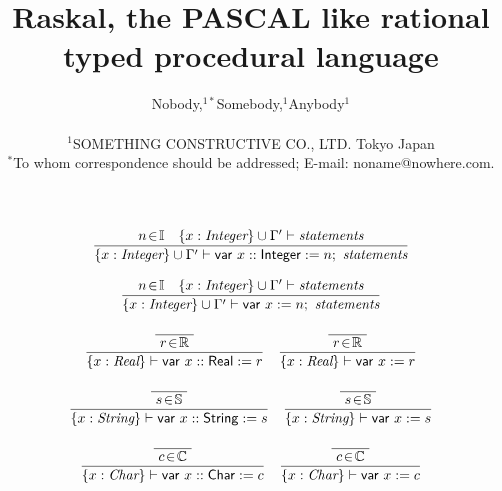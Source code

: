 \documentclass[12pt]{article}
\title{Raskal, the PASCAL like rational typed procedural language}
\author
{Nobody,$^{1\ast}$Somebody,$^{1}$Anybody$^{1}$\\
\\
\normalsize{$^{1}$SOMETHING CONSTRUCTIVE  CO., LTD. Tokyo Japan}\\
\normalsize{$^\ast$To whom correspondence should be addressed;
  E-mail: noname@nowhere.com.}
}
\date{}
\begin{document}
\maketitle

\begin{displaymath}
  \begin{array}{c}
    \dfrac{
      n \!\in\! \mathbb{I} \quad
      \{x : \text{\it Integer} \} \cup \Gamma' \vdash \text{\it statements}
    }{
      \{x : \text{\it Integer} \} \cup \Gamma' \vdash \mathsf{var}\ x ::
       \mathsf{Integer} := n ;\ \text{\it statements}
    }  \\
    \\
    
    \dfrac{
      n \!\in\! \mathbb{I} \quad
      \{x : \text{\it Integer} \} \cup \Gamma' \vdash \text{\it statements}
    }{
      \{x : \text{\it Integer} \} \cup \Gamma' \vdash \mathsf{var}\ x :=
       n;\ \text{\it statements}
    }  \\
    \\
    
    \begin{array}{rl}
      \dfrac{
        \dfrac{}{
          \raisebox{0.6ex}[2.3ex][0ex]{
            $r \!\in\! \mathbb{R}$
          }
        }
      }{
        \{x : \text{\it Real} \} \vdash \mathsf{var}\ x :: \mathsf{Real} := r
      }
      & \dfrac{
          \dfrac{}{
            \raisebox{0.6ex}[2.3ex][0ex]{
              $r \!\in\! \mathbb{R}$
            }
          }
        }{
          \{x : \text{\it Real} \} \vdash \mathsf{var}\ x := r
        }
    \end{array}  \\
    \\
    
    \begin{array}{rl}
      \dfrac{
        \dfrac{}{
          \raisebox{0.6ex}[2.3ex][0ex]{
            $s \!\in\! \mathbb{S}$
          }
        }
      }{
        \{x : \text{\it String} \} \vdash \mathsf{var}\ x :: \mathsf{String} := s
      }
      & \dfrac{
          \dfrac{}{
            \raisebox{0.6ex}[2.3ex][0ex]{
              $s \!\in\! \mathbb{S}$
            }
          }
        }{
          \{x : \text{\it String} \} \vdash \mathsf{var}\ x := s
        }
    \end{array}  \\
    \\
    
    \begin{array}{rl}
      \dfrac{
        \dfrac{}{
          \raisebox{0.6ex}[2.3ex][0ex]{
            $c \!\in\! \mathbb{C}$
          }
        }
      }{
        \{x : \text{\it Char} \} \vdash \mathsf{var}\ x :: \mathsf{Char} := c
      }
      & \dfrac{
          \dfrac{}{
            \raisebox{0.6ex}[2.3ex][0ex]{
              $c \!\in\! \mathbb{C}$
            }
          }
        }{
          \{x : \text{\it Char} \} \vdash \mathsf{var}\ x := c
        }
    \end{array}  \\
    \\


\end{array}
\end{displaymath}
\end{document}
